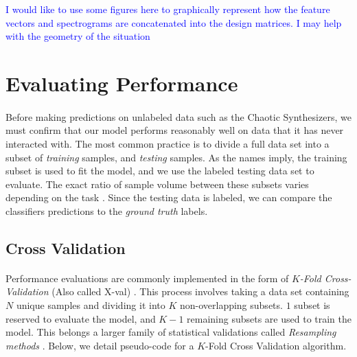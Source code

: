 \documentclass[12pt,letterpaper]{article}
\begin{document}
\textcolor{blue}{I would like to use some figures here to graphically represent how the feature vectors and spectrograms are concatenated into the design matrices. I may help with the geometry of the situation}




\newpage
\section{Evaluating Performance}
\label{sec-PerfEval}

\paragraph*{}Before making predictions on unlabeled data such as the Chaotic Synthesizers, we must confirm that our model performs reasonably well on data that it has never interacted with. The most common practice is to divide a full data set into a subset of \textit{training} samples, and \textit{testing} samples. As the names imply, the training subset is used to fit the model, and we use the labeled testing data set to evaluate. The exact ratio of sample volume between these subsets varies depending on the task \cite{Goodfellow,Geron2,Mitchell}. Since the testing data is labeled, we can compare the classifiers predictions to the \textit{ground truth} labels.


\subsection{Cross Validation}
\label{subsec-XValidation}

\paragraph*{}Performance evaluations are commonly implemented in the form of \textit{$K$-Fold Cross-Validation} (Also called X-val) \cite{Geron,Goodfellow}. This process involves taking a data set containing $N$ unique samples and dividing it into $K$ non-overlapping subsets. $1$ subset is reserved to evaluate the model, and $K-1$ remaining subsets are used to train the model. This belongs a larger family of statistical validations called \textit{Resampling methods} \cite{James}. Below, we detail pseudo-code for a $K$-Fold Cross Validation algorithm.
\end{document}
